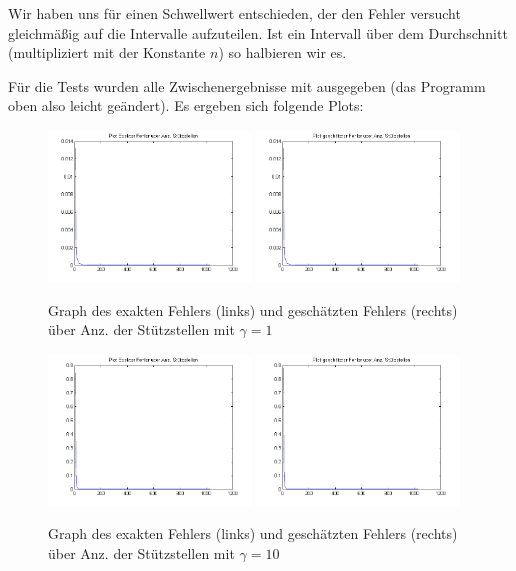 \documentclass[11pt,a4paper,ngerman]{article}
\begin{document}
Wir haben uns für einen Schwellwert entschieden, der den Fehler versucht gleichmäßig auf die Intervalle aufzuteilen. Ist ein Intervall über
dem Durchschnitt (multipliziert mit der Konstante $n$) so halbieren wir es.

Für die Tests wurden alle Zwischenergebnisse mit ausgegeben (das Programm oben also leicht geändert). Es ergeben sich folgende Plots:

\begin{figure}[h!]
\centering
\includegraphics[width=0.48\textwidth]{f1_1.png}
\includegraphics[width=0.48\textwidth]{f1_2.png}
\caption{Graph des exakten Fehlers (links) und geschätzten Fehlers (rechts) über Anz. der Stützstellen mit $\gamma = 1$ \label{fig:f1}}
\end{figure}

\begin{figure}[h!]
\centering
\includegraphics[width=0.48\textwidth]{f2_1.png}
\includegraphics[width=0.48\textwidth]{f2_2.png}
\caption{Graph des exakten Fehlers (links) und geschätzten Fehlers (rechts) über Anz. der Stützstellen mit $\gamma = 10$ \label{fig:f2}}
\end{figure}
\end{document}

